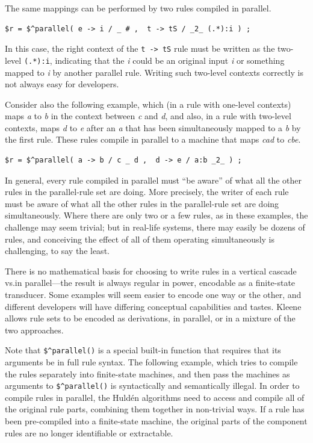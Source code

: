 \noindent
The same mappings can be performed by two rules compiled in parallel.

\begin{Verbatim}
$r = $^parallel( e -> i / _ # ,  t -> tS / _2_ (.*):i ) ;
\end{Verbatim}

\noindent
In this case, the right context of the \texttt{t -> tS} rule must be written as the
two-level \texttt{(.*):i}, indicating that the \emph{i} could be an original input
\emph{i} or something mapped to \emph{i} by another parallel rule.  Writing such two-level
contexts correctly is not always easy for developers.  

Consider also the following example, which (in a rule with one-level contexts) maps
\emph{a} to \emph{b} in the context between \emph{c} and
\emph{d}, and also, in a rule with two-level contexts, maps \emph{d} to \emph{e} after an
\emph{a} that has been simultaneously mapped to a \emph{b} by the first rule.  These rules compile
in parallel to a machine that maps \emph{cad} to \emph{cbe}.

\begin{Verbatim}
$r = $^parallel( a -> b / c _ d ,  d -> e / a:b _2_ ) ;
\end{Verbatim}

In general, every rule compiled in parallel must ``be aware'' of what all the other rules
in the parallel-rule set are doing.  More precisely, the writer of each rule must be aware of
what all the other rules in the parallel-rule set are doing
simultaneously.  Where there are only two or a few rules,
as in these examples, the challenge may seem trivial; but in real-life systems, there may
easily be
dozens of rules, and conceiving the effect of all of them operating simultaneously is
challenging, to say the least.

There is no mathematical basis for choosing to write rules in a vertical cascade vs.\@ in
parallel---the result is always regular in power, encodable as a finite-state transducer.
Some examples will seem easier to encode one way or the other, and different developers
will have differing conceptual capabilities and tastes.  Kleene allows rule sets to be
encoded as derivations, in parallel, or in a mixture of the two approaches.

Note that \verb!$^parallel()! is a special built-in function that requires that its arguments be in full rule syntax.  The following example, which
tries to compile the rules separately into finite-state machines, and then pass
the machines as arguments to \verb!$^parallel()! is syntactically and
semantically
illegal.  In order to compile rules in parallel, the Huld\'en algorithms need to access
and compile all of the original rule parts,
combining them together in non-trivial ways.  If a rule has been pre-compiled into a finite-state machine, the original parts of
the component rules are no longer identifiable or extractable.

